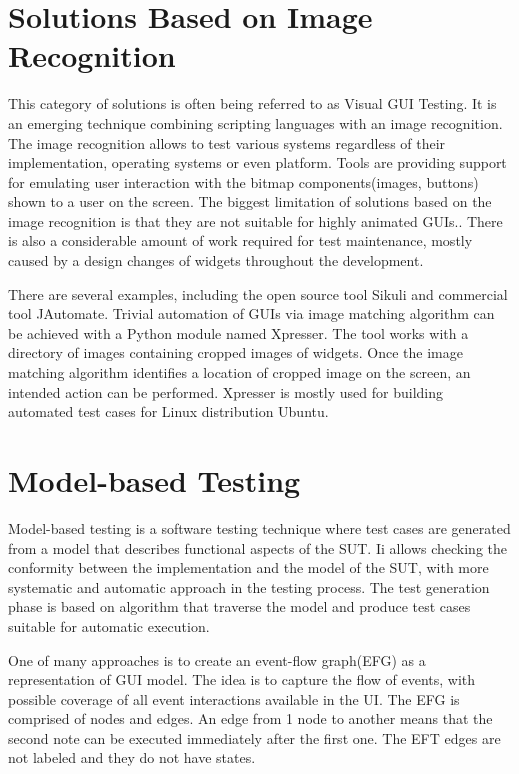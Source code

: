 \section{Solutions Based on Image Recognition}
This category of solutions is often being referred to as Visual GUI Testing. It is an emerging technique combining scripting languages with an image recognition. The image recognition allows to test various systems regardless of their implementation, operating systems or even platform. Tools are providing support for emulating user interaction with the bitmap components(images, buttons) shown to a user on the screen. The biggest limitation of solutions based on the image recognition is that they are not suitable for highly animated GUIs.\cite{guitesting}. There is also a considerable amount of work required for test maintenance, mostly caused by a design changes of widgets throughout the development.   

There are several examples, including the open source tool Sikuli and commercial tool JAutomate. Trivial automation of GUIs via image matching algorithm can be achieved with a Python module named Xpresser. The tool works with a directory of images containing cropped images of widgets. Once the image matching algorithm identifies a location of cropped image on the screen, an intended action can be performed.\cite{xpresser} Xpresser is mostly used for building automated test cases for Linux distribution Ubuntu.

\section{Model-based Testing}
Model-based testing is a software testing technique where test cases are generated from a model that describes functional aspects of the SUT. Ii allows checking the conformity between the implementation and the model of the SUT, with more systematic and automatic approach in the testing process. The test generation phase is based on algorithm that traverse the model and produce test cases suitable for automatic execution. 

One of many approaches is to create an event-flow graph(EFG) as a representation of GUI model. The idea is to capture the flow of events, with possible coverage of all event interactions available in the UI.  The EFG is comprised of nodes and edges. An edge from 1 node to another means that the second note can be executed immediately after the first one. The EFT edges are not labeled and they do not have states. 

